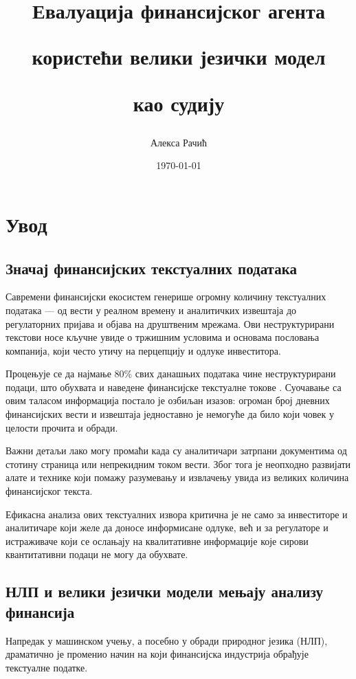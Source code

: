 \documentclass[a4paper, 12pt, master, utf8]{etf}
\author{Алекса Рачић}
\date{\today}
\title{Евалуација финансијског агента 

користећи велики језички модел

као судију
}
\begin{document}
\maketitle

\tableofcontents

\onehalfspacing
\newpage

\chapter{Увод}
\label{sec:1}

\section{Значај финансијских текстуалних података}

Савремени финансијски екосистем генерише огромну количину текстуалних података — од вести у реалном времену и аналитичких извештаја до регулаторних пријава и објава на друштвеним мрежама. Ови неструктурирани текстови носе кључне увиде о тржишним условима и основама пословања компанија, који често утичу на перцепцију и одлуке инвеститора. 

Процењује се да најмање 80\% свих данашњих података чине неструктурирани подаци, што обухвата и наведене финансијске текстуалне токове \cite{rocha_discovering_2021}. Суочавање са овим таласом информација постало је озбиљан изазов: огроман број дневних финансијских вести и извештаја једноставно је немогуће да било који човек у целости прочита и обради. 

Важни детаљи лако могу промаћи када су аналитичари затрпани документима од стотину страница или непрекидним током вести. Због тога је неопходно развијати алате и технике који помажу разумевању и извлачењу увида из великих количина финансијског текста. 

Ефикасна анализа ових текстуалних извора критична је не само за инвеститоре и аналитичаре који желе да доносе информисане одлуке, већ и за регулаторе и истраживаче који се ослањају на квалитативне информације које сирови квантитативни подаци не могу да обухвате.

\section{НЛП и велики језички модели мењају анализу финансија}

Напредак у машинском учењу, а посебно у обради природног језика (НЛП), драматично је променио начин на који финансијска индустрија обрађује текстуалне податке. 
\end{document}
